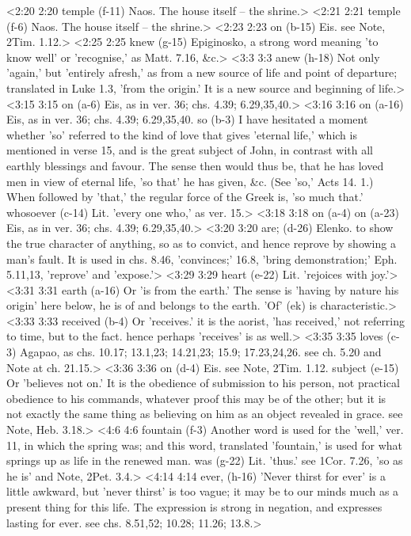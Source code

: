 <2:20 2:20  temple (f-11)  Naos. The house itself -- the shrine.>
<2:21 2:21  temple (f-6)  Naos. The house itself -- the shrine.>
<2:23 2:23  on (b-15)  Eis. see Note, 2Tim. 1.12.>
<2:25 2:25  knew (g-15)  Epiginosko, a strong word meaning 'to know well' or  'recognise,' as Matt. 7.16, &c.>
<3:3 3:3  anew (h-18)  Not only 'again,' but 'entirely afresh,' as from a new source  of life and point of departure; translated in Luke 1.3, 'from  the origin.' It is a new source and beginning of life.>
<3:15 3:15  on (a-6) Eis, as in ver. 36; chs. 4.39; 6.29,35,40.>
<3:16 3:16  on (a-16)  Eis, as in ver. 36; chs. 4.39; 6.29,35,40.
  so (b-3)  I have hesitated a moment whether 'so' referred to the kind  of love that gives 'eternal life,' which is mentioned in verse  15, and is the great subject of John, in contrast with all  earthly blessings and favour. The sense then would thus be,  that he has loved men in view of eternal life, 'so that' he has  given, &c. (See 'so,' Acts 14. 1.) When followed by 'that,' the  regular force of the Greek is, 'so much that.'
  whosoever (c-14)  Lit. 'every one who,' as ver. 15.>
<3:18 3:18  on (a-4)  on (a-23)
  Eis, as in ver. 36; chs. 4.39; 6.29,35,40.>
<3:20 3:20  are; (d-26)  Elenko. to show the true character of anything, so as to  convict, and hence reprove by showing a man's fault. It is used  in chs. 8.46, 'convinces;' 16.8, 'bring demonstration;' Eph.  5.11,13, 'reprove' and 'expose.'>
<3:29 3:29  heart (e-22)  Lit. 'rejoices with joy.'>
<3:31 3:31  earth (a-16)  Or 'is from the earth.' The sense is 'having by nature his  origin' here below, he is of and belongs to the earth. 'Of'  (ek) is characteristic.>
<3:33 3:33  received (b-4)  Or 'receives.' it is the aorist, 'has received,' not  referring to time, but to the fact. hence perhaps 'receives' is  as well.>
<3:35 3:35  loves (c-3)  Agapao, as chs. 10.17; 13.1,23; 14.21,23; 15.9;  17.23,24,26. see ch. 5.20 and Note at ch. 21.15.>
<3:36 3:36  on (d-4)  Eis. see Note, 2Tim. 1.12.
  subject (e-15)  Or 'believes not on.' It is the obedience of submission to  his person, not practical obedience to his commands, whatever  proof this may be of the other; but it is not exactly the same  thing as believing on him as an object revealed in grace. see  Note, Heb. 3.18.>
<4:6 4:6  fountain (f-3)  Another word is used for the 'well,' ver. 11, in which the  spring was; and this word, translated 'fountain,' is used for  what springs up as life in the renewed man.
  was (g-22)  Lit. 'thus.' see 1Cor. 7.26, 'so as he is' and Note, 2Pet.  3.4.>
<4:14 4:14  ever, (h-16)  'Never thirst for ever' is a little awkward, but 'never  thirst' is too vague; it may be to our minds much as a present  thing for this life. The expression is strong in negation, and  expresses lasting for ever. see chs. 8.51,52; 10.28; 11.26; 13.8.>
